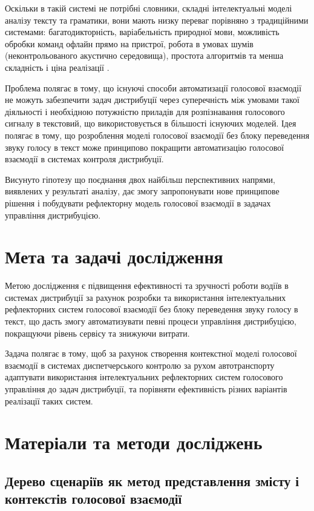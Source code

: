 Оскільки в такій системі не потрібні словники, складні інтелектуальні моделі аналізу тексту та граматики, вони мають низку переваг порівняно з традиційними системами: багатодикторність, варіабельність природної мови, можливість обробки команд офлайн прямо на пристрої, робота в умовах шумів (неконтрольованого акустично середовища), простота алгоритмів та менша складність і ціна реалізації \cite{Teslia_2013}.

Проблема полягає в тому, що існуючі способи автоматизації голосової взаємодії не можуть забезпечити задач дистрибуції через суперечність між умовами такої діяльності і необхідною потужністю приладів для розпізнавання голосового сигналу в текстовий, що використовується в більшості існуючих моделей. Ідея полягає в тому, що розроблення моделі голосової взаємодії без блоку переведення звуку голосу в текст може принципово покращити автоматизацію голосової взаємодії в системах контроля дистрибуції.

Висунуто гіпотезу що поєднання двох найбільш перспективних напрями, виявлених у результаті аналізу, дає змогу запропонувати нове принципове рішення і побудувати рефлекторну модель голосової взаємодії в задачах управління дистрибуцією.

\section{Мета та задачі дослідження}
Метою дослідження є підвищення ефективності та зручності роботи водіїв в системах дистрибуції за рахунок розробки та використання інтелектуальних рефлекторних систем голосової взаємодії без блоку переведення звуку голосу в текст, що дасть змогу автоматизувати певні процеси управління дистрибуцією, покращуючи рівень сервісу та знижуючи витрати.

Задача полягає в тому, щоб за рахунок створення контекстної моделі голосової взаємодії в системах диспетчерського контролю за рухом автотранспорту адаптувати використання інтелектуальних рефлекторних систем голосового управління до задач дистрибуції, та порівняти ефективність різних варіантів реалізації таких систем.


\section{Матеріали та методи досліджень}

\subsection{Дерево сценаріїв як метод представлення змісту і контекстів голосової взаємодії}

